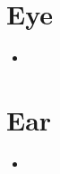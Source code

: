 \section{Eye}
\begin{center}
\end{center}
\begin{multicols}{2}
\begin{itemize}
  \item 
\end{itemize}
\end{multicols}

\section{Ear}
\begin{center}
\end{center}
\begin{multicols}{2}
\begin{itemize}
  \item 
\end{itemize}
\end{multicols}

